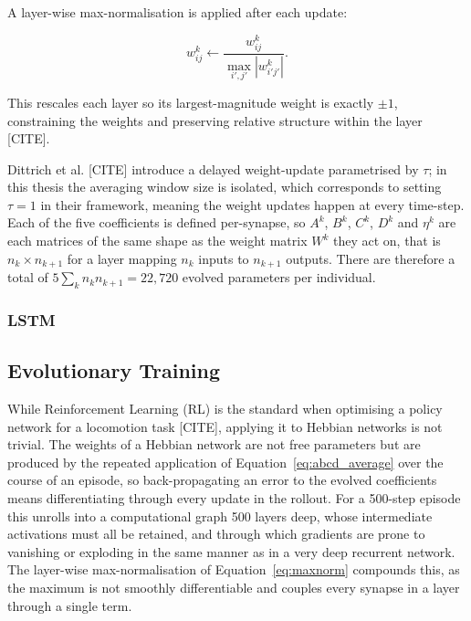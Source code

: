 \documentclass{article} %
\begin{document}
A layer-wise max-normalisation is applied after each update:

\begin{equation}
w_{ij}^{k} \leftarrow \frac{w_{ij}^{k}}
{\max_{i',j'} \left| w_{i'j'}^{k} \right|}.
\label{eq:maxnorm}
\end{equation}

This rescales each layer so its largest-magnitude weight is exactly $ \pm1$, constraining the weights and preserving relative structure within the layer [CITE]. 

Dittrich et al. [CITE] introduce a delayed weight-update parametrised by $\tau$; in this thesis the averaging window size is isolated, which corresponds to setting $\tau = 1$ in their framework, meaning the weight updates happen at every time-step. Each of the five coefficients is defined per-synapse, so $A^{k}$, $B^{k}$,
$C^{k}$, $D^{k}$ and $\eta^{k}$ are each matrices of the same shape as the
weight matrix $W^{k}$ they act on, that is $n_{k} \times n_{k+1}$ for a layer
mapping $n_{k}$ inputs to $n_{k+1}$ outputs. There are therefore a total of
$5 \sum_{k} n_{k} n_{k+1} = 22{,}720$ evolved parameters per individual.

\subsubsection{LSTM}
\label{subsec:lstm}

\subsection{Evolutionary Training}
\label{subsec:evolutionary_training}
While Reinforcement Learning (RL) is the standard when optimising a 
policy network for a locomotion task [CITE], applying it to Hebbian networks is not trivial. The weights of a
Hebbian network are not free parameters but are produced by the repeated
application of Equation~\ref{eq:abcd_average} over the course of an episode, so
back-propagating an error to the evolved coefficients means differentiating
through every update in the rollout. For a 500-step episode this unrolls into a
computational graph 500 layers deep, whose intermediate activations must all be
retained, and through which gradients are prone to vanishing or exploding in
the same manner as in a very deep recurrent network. The layer-wise
max-normalisation of Equation~\ref{eq:maxnorm} compounds this, as the maximum
is not smoothly differentiable and couples every synapse in a layer through a
single term. 
\end{document}

